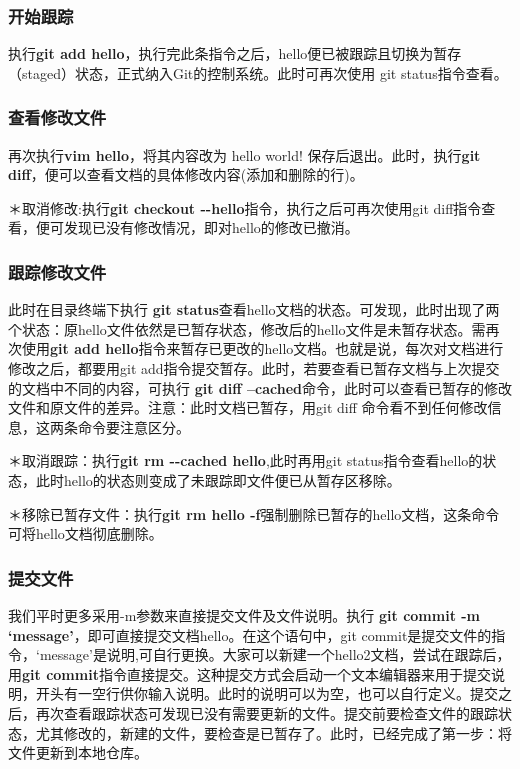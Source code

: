 \documentclass{article}
\begin{document}
\subsubsection{开始跟踪}
执行\textbf{git add hello}，执行完此条指令之后，hello便已被跟踪且切换为暂存（staged）状态，正式纳入Git的控制系统。此时可再次使用 git status指令查看。
\subsubsection{查看修改文件}
再次执行\textbf{vim hello}，将其内容改为 hello world! 保存后退出。此时，执行\textbf{git diff}，便可以查看文档的具体修改内容(添加和删除的行)。

＊取消修改:执行\textbf{git checkout {-}{-}hello}指令，执行之后可再次使用git diff指令查看，便可发现已没有修改情况，即对hello的修改已撤消。
\subsubsection{跟踪修改文件}
此时在目录终端下执行 \textbf{git status}查看hello文档的状态。可发现，此时出现了两个状态：原hello文件依然是已暂存状态，修改后的hello文件是未暂存状态。需再次使用\textbf{git add hello}指令来暂存已更改的hello文档。也就是说，每次对文档进行修改之后，都要用git add指令提交暂存。此时，若要查看已暂存文档与上次提交的文档中不同的内容，可执行 \textbf{git diff --cached}命令，此时可以查看已暂存的修改文件和原文件的差异。注意：此时文档已暂存，用git diff 命令看不到任何修改信息，这两条命令要注意区分。

＊取消跟踪：执行\textbf{git rm {-}{-}cached hello},此时再用git status指令查看hello的状态，此时hello的状态则变成了未跟踪即文件便已从暂存区移除。

＊移除已暂存文件：执行\textbf{git rm hello -f}强制删除已暂存的hello文档，这条命令可将hello文档彻底删除。
\subsubsection{提交文件}
我们平时更多采用-m参数来直接提交文件及文件说明。执行 \textbf{git commit -m `message'}，即可直接提交文档hello。在这个语句中，git commit是提交文件的指令，`message'是说明,可自行更换。大家可以新建一个hello2文档，尝试在跟踪后，用\textbf{git commit}指令直接提交。这种提交方式会启动一个文本编辑器来用于提交说明，开头有一空行供你输入说明。此时的说明可以为空，也可以自行定义。提交之后，再次查看跟踪状态可发现已没有需要更新的文件。提交前要检查文件的跟踪状态，尤其修改的，新建的文件，要检查是已暂存了。此时，已经完成了第一步：将文件更新到本地仓库。
\end{document}
